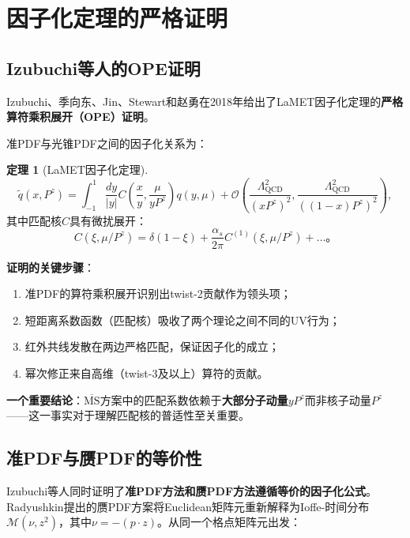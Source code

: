 \documentclass[12pt,a4paper]{ctexart}
\theoremstyle{definition}
\newtheorem{theorem}{定理}[section]
\begin{document}
\section{因子化定理的严格证明}

\subsection{Izubuchi等人的OPE证明}

Izubuchi、季向东、Jin、Stewart和赵勇在2018年给出了LaMET因子化定理的\textbf{严格算符乘积展开（OPE）证明}\cite{Izubuchi2018}。

准PDF与光锥PDF之间的因子化关系为：

\begin{theorem}[LaMET因子化定理]\cite{Izubuchi2018}
\begin{equation}
\boxed{\tilde{q}(x, P^z) = \int_{-1}^{1} \frac{dy}{|y|} C\left(\frac{x}{y}, \frac{\mu}{yP^z}\right) q(y, \mu) + \mathcal{O}\left(\frac{\Lambda_{\text{QCD}}^2}{(xP^z)^2}, \frac{\Lambda_{\text{QCD}}^2}{((1-x)P^z)^2}\right)},
\label{eq:factorization_theorem}
\end{equation}
其中匹配核$C$具有微扰展开：
\begin{equation}
C(\xi, \mu/P^z) = \delta(1-\xi) + \frac{\alpha_s}{2\pi} C^{(1)}(\xi, \mu/P^z) + \ldots。
\end{equation}
\end{theorem}

\textbf{证明的关键步骤}\cite{Izubuchi2018}：

\begin{enumerate}
    \item 准PDF的算符乘积展开识别出twist-2贡献作为领头项；
    \item 短距离系数函数（匹配核）吸收了两个理论之间不同的UV行为；
    \item 红外共线发散在两边严格匹配，保证因子化的成立；
    \item 幂次修正来自高维（twist-3及以上）算符的贡献。
\end{enumerate}

\textbf{一个重要结论}\cite{Izubuchi2018}：$\overline{\text{MS}}$方案中的匹配系数依赖于\textbf{大部分子动量}$yP^z$而非核子动量$P^z$——这一事实对于理解匹配核的普适性至关重要。

\subsection{准PDF与赝PDF的等价性}

Izubuchi等人\cite{Izubuchi2018}同时证明了\textbf{准PDF方法和赝PDF方法遵循等价的因子化公式}。Radyushkin提出的赝PDF方案将Euclidean矩阵元重新解释为Ioffe-时间分布$\mathcal{M}(\nu, z^2)$，其中$\nu = -(p\cdot z)$。从同一个格点矩阵元出发：
\end{document}
